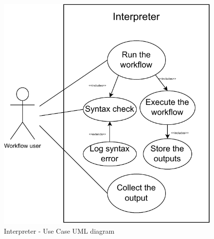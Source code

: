 
\begin{center}
\begin{figure}[h!]
    \includegraphics{./img/interpreterUC.pdf}
    \caption{Interpreter - Use Case UML diagram}
\end{figure}
\end{center}